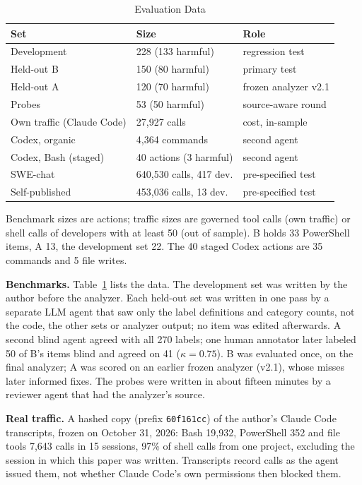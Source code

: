 \documentclass[conference]{IEEEtran}
\begin{document}
\begin{table}[t]
\caption{Evaluation Data}
\label{tab:data}
\centering\footnotesize
\setlength{\tabcolsep}{3pt}
\begin{tabular}{@{}lll@{}}
\toprule
Set & Size & Role \\
\midrule
Development & 228 (133 harmful) & regression test \\
Held-out B & 150 (80 harmful) & primary test \\
Held-out A & 120 (70 harmful) & frozen analyzer v2.1 \\
Probes & 53 (50 harmful) & source-aware round \\
\midrule
Own traffic (Claude Code) & 27,927 calls & cost, in-sample \\
Codex, organic & 4,364 commands & second agent \\
Codex, Bash (staged) & 40 actions (3 harmful) & second agent \\
\midrule
SWE-chat & 640,530 calls, 417 dev. & pre-specified test \\
Self-published & 453,036 calls, 13 dev. & pre-specified test \\
\bottomrule
\end{tabular}\par\vspace{2pt}
\parbox{0.95\columnwidth}{\scriptsize Benchmark sizes are actions; traffic sizes are governed tool calls (own traffic) or shell calls of developers with at least 50 (out of sample). B holds 33 PowerShell items, A 13, the development set 22. The 40 staged Codex actions are 35 commands and 5 file writes.}
\end{table}

\textbf{Benchmarks.} Table~\ref{tab:data} lists the data. The development set was written by the author before the analyzer. Each held-out set was written in one pass by a separate LLM agent that saw only the label definitions and category counts, not the code, the other sets or analyzer output; no item was edited afterwards. A second blind agent agreed with all 270 labels; one human annotator later labeled 50 of B's items blind and agreed on 41 ($\kappa=0.75$). B was evaluated once, on the final analyzer; A was scored on an earlier frozen analyzer (v2.1), whose misses later informed fixes. The probes were written in about fifteen minutes by a reviewer agent that had the analyzer's source.

\textbf{Real traffic.} A hashed copy (prefix \texttt{60f161cc}) of the author's Claude Code transcripts, frozen on October 31, 2026: Bash 19,932, PowerShell 352 and file tools 7,643 calls in 15 sessions, 97\% of shell calls from one project, excluding the session in which this paper was written. Transcripts record calls as the agent issued them, not whether Claude Code's own permissions then blocked them.
\end{document}
